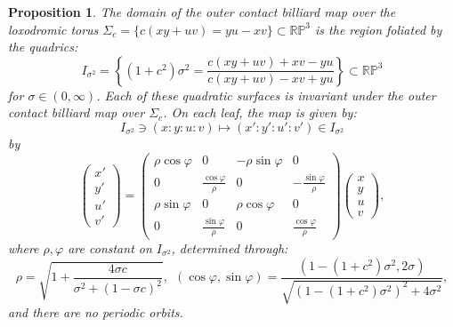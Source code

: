 \documentclass{article}
\newtheorem{prop}{Proposition}[section]
\begin{document}
\begin{appendix}
\begin{prop}
\label{prop:LoxTori}
The domain of the outer contact billiard map over the loxodromic torus $\Sigma_c=\{c(xy+uv) = yu -xv \}\subset \mathbb{RP}^3$ is the region foliated by the quadrics:
\[I_{\sigma^2}=\left\{ (1 +c^2)\sigma^2 = \frac{c(xy + uv) + xv - yu}{c(xy + uv) -xv + yu}  \right\}\subset \mathbb{RP}^3\]
for $\sigma\in (0,\infty)$. Each of these quadratic surfaces is invariant under the outer contact billiard map over $\Sigma_c$. On each leaf, the map is given by:
\[I_{\sigma^2} \ni (x: y: u: v) \mapsto (x':y': u': v') \in I_{\sigma^2}\]
by
\[\begin{pmatrix}
    x'\\
    y'\\
    u'\\
    v'
\end{pmatrix} =\begin{pmatrix}
    \rho\cos\varphi & 0 & -\rho \sin\varphi & 0\\
    0  &\frac{\cos\varphi}{\rho} & 0 & -\frac{\sin\varphi}{\rho} \\
    \rho\sin\varphi & 0 & \rho \cos\varphi & 0 \\
    0 & \frac{\sin\varphi}{\rho} & 0 & \frac{\cos\varphi}{\rho}
\end{pmatrix} \begin{pmatrix}
    x \\
    y \\
    u \\
    v
\end{pmatrix},\]
where $\rho, \varphi$ are constant on $I_{\sigma^2}$, determined through:
\[ \rho = \sqrt{1 + \frac{4\sigma c}{\sigma^2 + (1-\sigma c)^2}}, ~~(\cos\varphi, \sin\varphi) = \frac{(1 - (1+c^2)\sigma^2, 2\sigma)}{\sqrt{ (1 - (1 + c^2)\sigma^2)^2 + 4\sigma^2}}, \]
and there are no periodic orbits.


\end{prop}
\end{appendix}
\end{document}
